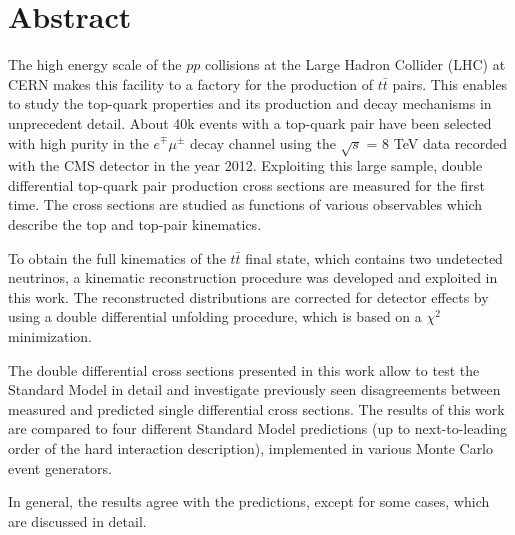 \thispagestyle{empty}
\vspace{-3cm}
\section*{\centering Abstract}

\vspace{\baselineskip}

The high energy scale of the $pp$ collisions at the Large Hadron Collider (LHC) at CERN makes this facility
to a factory for the production of $t\bar{t}$ pairs. This enables to study the top-quark 
properties and its production and decay mechanisms in unprecedent detail. About 40k events with a 
top-quark pair have been selected with high purity in the 
$e^{\mp}\mu^{\pm}$ decay channel using the $\sqrt{s}$ = 8 TeV data recorded with the CMS detector 
in the year 2012. Exploiting this large sample, double differential top-quark pair production 
cross sections are measured for the first time. The cross sections are studied as functions of
various observables which describe the top and top-pair kinematics. 

To obtain the full kinematics of the $t\bar{t}$ final state, which contains two undetected neutrinos,
a kinematic reconstruction procedure was developed and exploited in this work. The reconstructed distributions
are corrected for detector effects by using a double differential unfolding procedure, which is
based on a $\chi^{2}$ minimization.

The double differential cross sections presented in this work allow to test the Standard Model 
in detail and investigate previously seen disagreements between measured and predicted single differential cross sections.
The results of this work are compared to four different Standard Model predictions (up to next-to-leading order
of the hard interaction description), implemented in various Monte Carlo event generators.

In general, the results agree with the predictions, except for some cases, which are discussed
in detail.

\clearpage